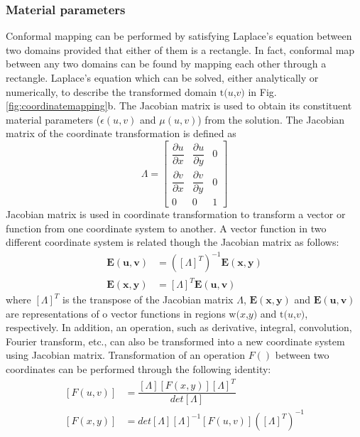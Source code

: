 \subsubsection{Material parameters}

Conformal mapping can be performed by satisfying Laplace's equation between two domains provided that either of them is a rectangle. In fact, conformal map between any two domains can be found by mapping each other through a rectangle. Laplace's equation which can be solved, either analytically or numerically, to describe the transformed domain $\mathrm{t}(u$,$v)$ in Fig. \ref{fig:coordinatemapping}b. The Jacobian matrix is used to obtain its constituent material parameters ($\epsilon(u,v)$ and $\mu(u,v)$) from the solution. The Jacobian matrix of the coordinate transformation is defined as
\begin{equation} \label{jacobian}
	\Lambda = \begin{bmatrix}
		\dfrac{\partial u}{\partial x} & \dfrac{\partial u}{\partial y} & 0 \\
		\dfrac{\partial v}{\partial x} & \dfrac{\partial v}{\partial y} & 0 \\
		0                             & 0                             & 1   
	\end{bmatrix}
\end{equation} 
Jacobian matrix is used in coordinate transformation to transform a vector or function from one coordinate system to another. A vector function in two different coordinate system is related though the Jacobian matrix as follows:
%
\begin{subequations} \label{eq:functran}
	\begin{align}
		\mathbf{E(u,v)} & = ([\Lambda]^T)^{-1} \mathbf{E(x,y)} \\
		\mathbf{E(x,y)}  &= [\Lambda]^T \mathbf{E(u,v)}
	\end{align}
\end{subequations}
%
where $[\Lambda]^T$ is the transpose of the Jacobian matrix $\Lambda$, $\mathbf{E(x,y)}$ and $\mathbf{E(u,v)}$ are representations of o vector functions in regions $\mathrm{w}(x$,$y)$ and $\mathrm{t}(u$,$v)$, respectively. In addition, an operation, such as derivative, integral, convolution, Fourier transform, etc., can also be transformed into a new coordinate system using Jacobian matrix. Transformation of an operation $F()$ between two coordinates can be performed through the following identity: 
%
\begin{subequations} \label{eq:opctran}
	\begin{align}
		[F(u,v)] &= \dfrac{[\Lambda][F(x,y)][\Lambda]^T}{det[\Lambda]} \\
		[F(x,y)] &= det[\Lambda] [\Lambda]^{-1} [F(u,v)] ([\Lambda]^T)^{-1} 
	\end{align}
\end{subequations}
